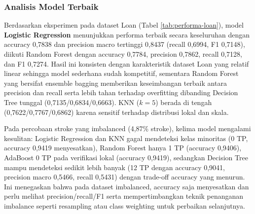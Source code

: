 \documentclass[a4paper,oneside,12pt]{report}
\begin{document}
\subsubsection{Analisis Model Terbaik}
Berdasarkan eksperimen pada dataset Loan (Tabel \ref{tab:performa-loan}), model \textbf{Logistic Regression} menunjukkan performa terbaik secara keseluruhan dengan accuracy 0,7838 dan precision macro tertinggi 0,8437 (recall 0,6994, F1 0,7148), diikuti Random Forest dengan accuracy 0,7784, precision 0,7862, recall 0,7128, dan F1 0,7274. Hasil ini konsisten dengan karakteristik dataset Loan yang relatif linear sehingga model sederhana sudah kompetitif, sementara Random Forest yang bersifat ensemble bagging memberikan keseimbangan terbaik antara precision dan recall serta lebih tahan terhadap overfitting dibanding Decision Tree tunggal (0,7135/0,6834/0,6663). KNN ($k=5$) berada di tengah (0,7622/0,7767/0,6862) karena sensitif terhadap distribusi lokal dan skala.

Pada percobaan stroke yang imbalanced (4,87\% stroke), kelima model mengalami kesulitan: Logistic Regression dan KNN gagal mendeteksi kelas minoritas (0 TP, accuracy 0,9419 menyesatkan), Random Forest hanya 1 TP (accuracy 0,9406), AdaBoost 0 TP pada verifikasi lokal (accuracy 0,9419), sedangkan Decision Tree mampu mendeteksi sedikit lebih banyak (12 TP dengan accuracy 0,9041, precision macro 0,5466, recall 0,5431) dengan trade-off accuracy yang menurun. Ini menegaskan bahwa pada dataset imbalanced, accuracy saja menyesatkan dan perlu melihat precision/recall/F1 serta mempertimbangkan teknik penanganan imbalance seperti resampling atau class weighting untuk perbaikan selanjutnya.

\clearpage
\end{document}
